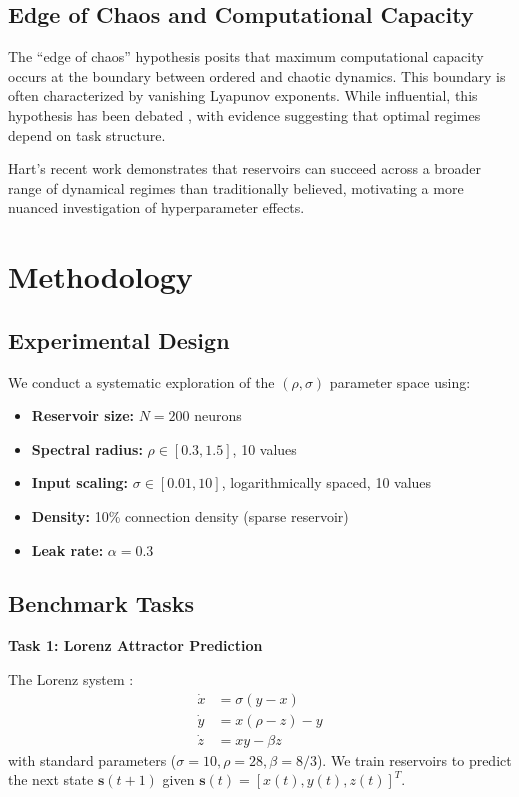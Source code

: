 \documentclass[11pt]{article}
\begin{document}
\subsection{Edge of Chaos and Computational Capacity}

The ``edge of chaos'' hypothesis \cite{bertschinger2004real} posits that maximum computational capacity occurs at the boundary between ordered and chaotic dynamics. This boundary is often characterized by vanishing Lyapunov exponents. While influential, this hypothesis has been debated \cite{boedecker2012information}, with evidence suggesting that optimal regimes depend on task structure.

Hart's recent work \cite{hart2024thesis} demonstrates that reservoirs can succeed across a broader range of dynamical regimes than traditionally believed, motivating a more nuanced investigation of hyperparameter effects.

\section{Methodology}

\subsection{Experimental Design}

We conduct a systematic exploration of the $(\rho, \sigma)$ parameter space using:

\begin{itemize}
    \item \textbf{Reservoir size:} $N = 200$ neurons
    \item \textbf{Spectral radius:} $\rho \in [0.3, 1.5]$, 10 values
    \item \textbf{Input scaling:} $\sigma \in [0.01, 10]$, logarithmically spaced, 10 values
    \item \textbf{Density:} 10\% connection density (sparse reservoir)
    \item \textbf{Leak rate:} $\alpha = 0.3$
\end{itemize}

\subsection{Benchmark Tasks}

\textbf{Task 1: Lorenz Attractor Prediction}

The Lorenz system \cite{lorenz1963deterministic}:
\begin{align}
    \dot{x} &= \sigma(y - x) \\
    \dot{y} &= x(\rho - z) - y \\
    \dot{z} &= xy - \beta z
\end{align}
with standard parameters ($\sigma=10, \rho=28, \beta=8/3$). We train reservoirs to predict the next state $\mathbf{s}(t+1)$ given $\mathbf{s}(t) = [x(t), y(t), z(t)]^T$.
\end{document}
